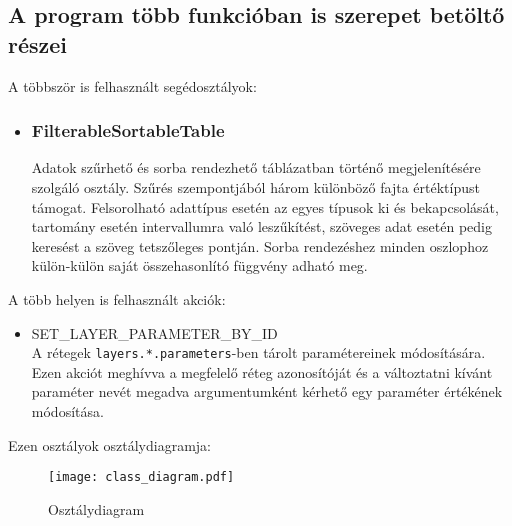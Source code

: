 \subsection{A program több funkcióban is szerepet betöltő részei}

\noindent A többször is felhasznált segédosztályok:

\begin{itemize}

\item\subsubsection{FilterableSortableTable}
Adatok szűrhető és sorba rendezhető táblázatban történő megjelenítésére szolgáló
osztály. Szűrés szempontjából három különböző fajta értéktípust támogat.
Felsorolható adattípus esetén az egyes típusok ki és bekapcsolását, tartomány
esetén intervallumra való leszűkítést, szöveges adat esetén pedig keresést a
szöveg tetszőleges pontján. Sorba rendezéshez minden oszlophoz külön-külön saját
összehasonlító függvény adható meg.

\end{itemize}

\noindent A több helyen is felhasznált akciók:
\begin{itemize}

\item SET\_LAYER\_PARAMETER\_BY\_ID \\
A rétegek \verb|layers.*.parameters|-ben tárolt paramétereinek módosítására.
Ezen akciót meghívva a megfelelő réteg azonosítóját és a változtatni kívánt
paraméter nevét megadva argumentumként kérhető egy paraméter értékének
módosítása.

\end{itemize}

Ezen osztályok osztálydiagramja:

\begin{figure}[H]
  \texttt{[image: class\_diagram.pdf]}
  \caption{Osztálydiagram}
  \label{fig:class_diagram}
\end{figure}
